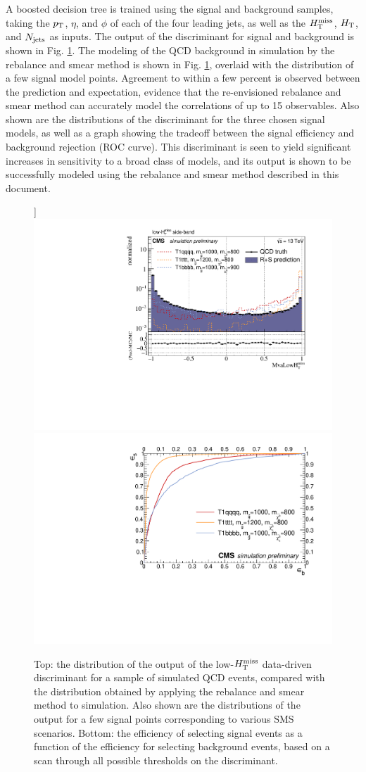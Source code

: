 A boosted decision tree is trained using the signal and background samples, taking the $p_{\text{T}}$, $\eta$, and $\phi$ of each of the four leading jets, as well as the $H_{\text{T}}^{\rm miss}$, $H_{\rm T}$, and $N_{\rm jets}$ as inputs. The output of the discriminant for signal and background is shown in Fig. \ref{fig:SusyBdt}. The modeling of the QCD background in simulation by the rebalance and smear method is shown in Fig. \ref{fig:SusyBdt}, overlaid with the distribution of a few signal model points. Agreement to within a few percent is observed between the prediction and expectation, evidence that the re-envisioned rebalance and smear method can accurately model the correlations of up to 15 observables. Also shown are the distributions of the discriminant for the three chosen signal models, as well as a graph showing the tradeoff between the signal efficiency and background rejection (ROC curve). This discriminant is seen to yield significant increases in sensitivity to a broad class of models, and its output is shown to be successfully modeled using the rebalance and smear method described in this document. 
\begin{figure}[[tb!]]
\centering
\includegraphics[width=0.7\linewidth]{figures/SusySearches/MvaSusy/MvaLowMht.pdf}
\includegraphics[width=0.7\linewidth]{figures/SusySearches/MvaSusy/RocCurvesLowMht_QCDVsSUSY.pdf}
\caption{Top: the distribution of the output of the low-$H_{\text{T}}^{\rm miss}$ data-driven discriminant for a sample of simulated QCD events, compared with the distribution obtained by applying the rebalance and smear method to simulation. Also shown are the distributions of the output for a few signal points corresponding to various SMS scenarios. Bottom: the efficiency of selecting signal events as a function of the efficiency for selecting background events, based on a scan through all possible thresholds on the discriminant.}
\label{fig:SusyBdt}
\end{figure}

